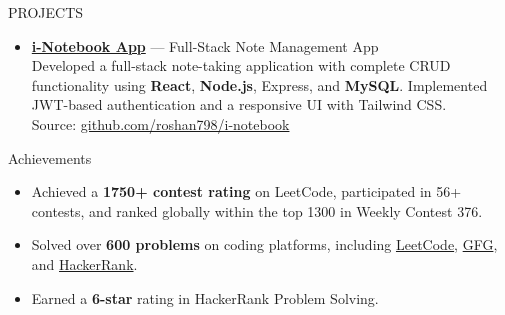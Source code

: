 \documentclass{resume} %
\begin{document}
\begin{rSection}{PROJECTS}
\begin{itemize}

\item \href{https://i-notebook-app-nine.vercel.app/}{\textbf{i-Notebook App}}
  --- Full-Stack Note Management App\\
  Developed a full-stack note-taking application with complete CRUD functionality
  using \textbf{React}, \textbf{Node.js}, Express, and \textbf{MySQL}.
  Implemented JWT-based authentication and a responsive UI with Tailwind CSS.\\
  Source: \href{https://github.com/roshan798/i-notebook-app}{github.com/roshan798/i-notebook}



\end{itemize}
\end{rSection}


\begin{rSection}{Achievements}
\begin{itemize}
  \item Achieved a \textbf{1750+ contest rating} on LeetCode, participated in
        56+ contests, and ranked globally within the top 1300 in Weekly Contest 376.
  \item Solved over \textbf{600 problems} on coding platforms, including
        \href{https://leetcode.com/u/Roshan_kumar7989/}{LeetCode},
        \href{https://auth.geeksforgeeks.org/user/roshan_sahu/}{GFG}, and
        \href{https://www.hackerrank.com/rsahu7989}{HackerRank}.
  \item Earned a \textbf{6-star} rating in HackerRank Problem Solving.
\end{itemize}
\end{rSection}
\end{document}
